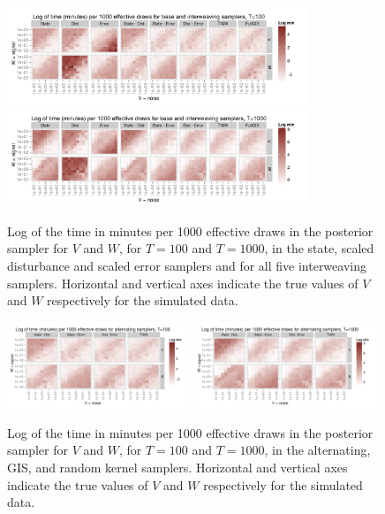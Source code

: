 \documentclass{article}
\begin{document}
\begin{figure}[!ht]
\centering
\includegraphics[width=0.8\textwidth]{baseinttimeplot1}
\includegraphics[width=0.8\textwidth]{baseinttimeplot2}
\caption{Log of the time in minutes per 1000 effective draws in the posterior sampler for $V$ and $W$, for $T=100$ and $T=1000$, in the state, scaled disturbance and scaled error samplers and for all five interweaving samplers. Horizontal and vertical axes indicate the true values of $V$ and $W$ respectively for the simulated data. }
\label{baseinttimeplot}
\end{figure}


\begin{figure}[!ht]
\centering
\includegraphics[width=0.49\textwidth]{altinttimeplot1}
\includegraphics[width=0.49\textwidth]{altinttimeplot2}
\caption{Log of the time in minutes per 1000 effective draws in the posterior sampler for $V$ and $W$, for $T=100$ and $T=1000$, in the alternating, GIS, and random kernel samplers. Horizontal and vertical axes indicate the true values of $V$ and $W$ respectively for the simulated data. }
\label{altinttimeplot}
\end{figure}
\end{document}
